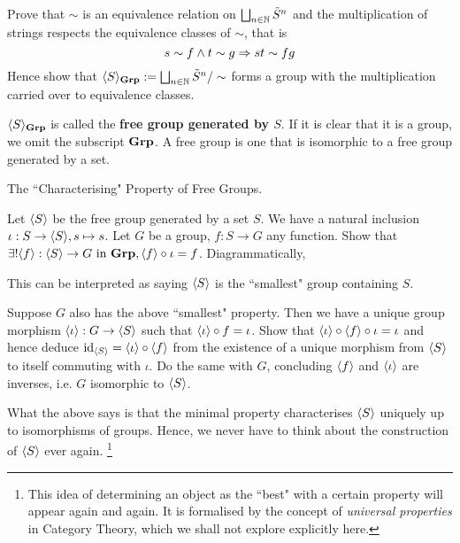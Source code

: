 \documentclass[../../book.tex]{subfiles}
\begin{document}
\begin{ex}
    Prove that $\sim$ is an equivalence relation on 
    $\bigsqcup_{n \in \mathbb{N}} \tilde{S}^n$
    and the multiplication of strings respects the equivalence classes of $\sim$,
    that is
    \[
        s \sim f \land t \sim g \Rightarrow st \sim fg
    \]
    Hence show that $\langle S \rangle_{\mathbf{Grp}} := 
    \bigsqcup_{n \in \mathbb{N}} \tilde{S}^n / \sim$
    forms a group with the multiplication carried over to equivalence classes. 
    
    $\langle S \rangle_{\mathbf{Grp}}$ is called the \textbf{free group generated by $S$}. 
    If it is clear that it is a group, we omit the subscript $\mathbf{Grp}$.
    A free group is one that is isomorphic to a free group generated by a set. 
\end{ex}

\begin{ex} The ``Characterising" Property of Free Groups. 

    Let $\langle S \rangle$ be the free group generated by a set $S$. 
    We have a natural inclusion $\iota : S \to \langle S \rangle, s \mapsto s$.
    Let $G$ be a group, $f : S \to G$ any function. 
    Show that 
    $\exists ! \langle f \rangle : \langle S \rangle \to G \text{ in } \mathbf{Grp}, 
    \langle f \rangle \circ \iota = f$. 
    Diagrammatically, 
    \begin{figure} [ht]
        \centering
    \end{figure}
    
    This can be interpreted as saying $\langle S \rangle$ is the 
    ``smallest" group containing $S$. 
    
    Suppose $G$ also has the above ``smallest" property.
    Then we have a unique group morphism $\langle \iota \rangle : G \to \langle S\rangle$ such that
    $\langle\iota\rangle \circ f = \iota$. 
    Show that $\langle\iota\rangle \circ \langle f\rangle \circ \iota = \iota$ and
    hence deduce $\mathrm{id}_{\langle S\rangle} = \langle\iota\rangle \circ \langle f\rangle$ from
    the existence of a unique morphism from $\langle S\rangle$ to itself commuting with $\iota$.
    Do the same with $G$, concluding $\langle f\rangle$ and $\langle\iota\rangle$ are inverses,
    i.e. $G$ isomorphic to $\langle S\rangle$.
    
    What the above says is that 
    the minimal property characterises $\langle S \rangle$ uniquely
    up to isomorphisms of groups. 
    Hence, we never have to think about 
    the construction of $\langle S \rangle$ ever again.
    \footnote{
        This idea of determining an object
        as the ``best" with a certain property will appear again and again. 
        It is formalised by the concept of \emph{universal properties} in Category Theory,
        which we shall not explore explicitly here. 
    }
    
\end{ex}
\end{document}
